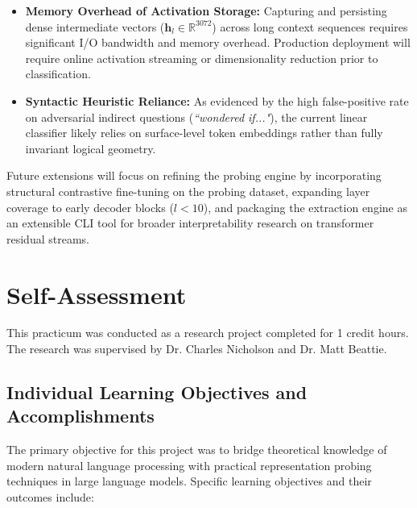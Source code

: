 \documentclass[12 pt]{article}  %
\begin{document}
\begin{itemize}
    \item \textbf{Memory Overhead of Activation Storage:} Capturing and 
    persisting dense intermediate vectors ($\mathbf{h}_l \in \mathbb{R}^{3072}$) 
    across long context sequences requires significant I/O bandwidth and memory 
    overhead. Production deployment will require online activation streaming or 
    dimensionality reduction prior to classification.
    \item \textbf{Syntactic Heuristic Reliance:} As evidenced by the high 
    false-positive rate on adversarial indirect questions (\textit{``wondered if..."}), 
    the current linear classifier likely relies on surface-level token 
    embeddings rather than fully invariant logical geometry.
\end{itemize}

Future extensions will focus on refining the probing engine by incorporating 
structural contrastive fine-tuning on the probing dataset, expanding layer 
coverage to early decoder blocks ($l < 10$), and packaging the extraction engine 
as an extensible CLI tool for broader interpretability research on transformer 
residual streams.

\section{Self-Assessment}

This practicum was conducted as a research project completed for 1 credit hours. 
The research was supervised by Dr. Charles Nicholson and Dr. Matt Beattie.

\subsection{Individual Learning Objectives and Accomplishments}

The primary objective for this project was to bridge theoretical knowledge of 
modern natural language processing with practical representation probing 
techniques in large language models. Specific learning objectives and their 
outcomes include:
\end{document}
